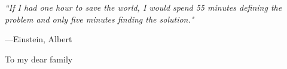 \documentclass[12pt,a4paper,twoside]{Thesis} %
\begin{document}
\pagestyle{empty} %
\emph{``If I had one hour to save the world, I would spend 55 minutes defining the problem and only five minutes finding the solution."}

\begin{flushright}
---Einstein, Albert
\end{flushright}
\null\vfill %

\begin{center}
\large{To my dear family}
\end{center}
\vfill\vfill\null %

\cleardoublepage %


\end{document}
